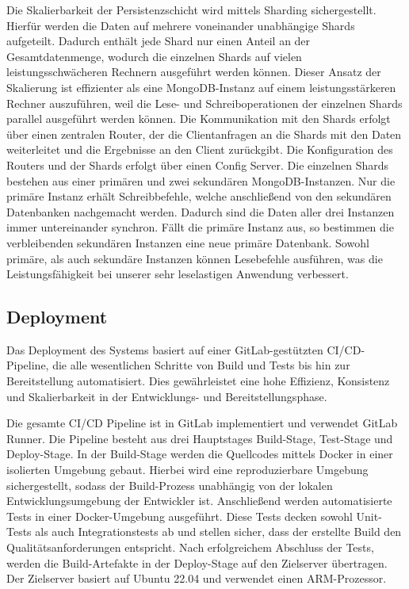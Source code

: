\documentclass[conference,a4paper,flushend]{cs-techrep}
\begin{document}
Die Skalierbarkeit der Persistenzschicht wird mittels Sharding sichergestellt. Hierfür werden die Daten auf mehrere voneinander unabhängige Shards aufgeteilt. Dadurch enthält jede Shard nur einen Anteil an der Gesamtdatenmenge, wodurch die einzelnen Shards auf vielen leistungsschwächeren Rechnern ausgeführt werden können. Dieser Ansatz der Skalierung ist effizienter als eine MongoDB-Instanz auf einem leistungsstärkeren Rechner auszuführen, weil die Lese- und Schreiboperationen der einzelnen Shards parallel ausgeführt werden können. Die Kommunikation mit den Shards erfolgt über einen zentralen Router, der die Clientanfragen an die Shards mit den Daten weiterleitet und die Ergebnisse an den Client zurückgibt. Die Konfiguration des Routers und der Shards erfolgt über einen Config Server. Die einzelnen Shards bestehen aus einer primären und zwei sekundären MongoDB-Instanzen. Nur die primäre Instanz erhält Schreibbefehle, welche anschließend von den sekundären Datenbanken nachgemacht werden. Dadurch sind die Daten aller drei Instanzen immer untereinander synchron. Fällt die primäre Instanz aus, so bestimmen die verbleibenden sekundären Instanzen eine neue primäre Datenbank. Sowohl primäre, als auch sekundäre Instanzen können Lesebefehle ausführen, was die Leistungsfähigkeit bei unserer sehr leselastigen Anwendung verbessert.

\subsection{Deployment}
Das Deployment des Systems basiert auf einer GitLab-gestützten CI/CD-Pipeline, die alle wesentlichen Schritte von Build und Tests bis hin zur Bereitstellung automatisiert. Dies gewährleistet eine hohe Effizienz, Konsistenz und Skalierbarkeit in der Entwicklungs- und Bereitstellungsphase.

Die gesamte CI/CD Pipeline ist in GitLab implementiert und verwendet GitLab Runner. Die Pipeline besteht aus drei Hauptstages Build-Stage, Test-Stage und Deploy-Stage.
In der Build-Stage werden die Quellcodes mittels Docker in einer isolierten Umgebung gebaut. Hierbei wird eine reproduzierbare Umgebung sichergestellt, sodass der Build-Prozess unabhängig von der lokalen Entwicklungsumgebung der Entwickler ist.
Anschließend werden automatisierte Tests in einer Docker-Umgebung ausgeführt. Diese Tests decken sowohl Unit-Tests als auch Integrationstests ab und stellen sicher, dass der erstellte Build den Qualitätsanforderungen entspricht.
Nach erfolgreichem Abschluss der Tests, werden die Build-Artefakte in der Deploy-Stage auf den Zielserver übertragen. Der Zielserver basiert auf Ubuntu 22.04 und verwendet einen ARM-Prozessor.
\end{document}
